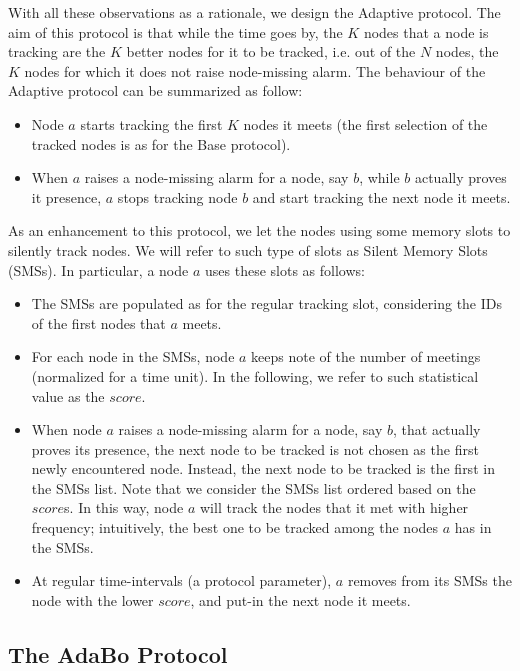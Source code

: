 \documentclass{IEEEconf}
\begin{document}
With all these observations as a rationale, we design the Adaptive protocol. The aim of this protocol is that while the time goes by, the $K$ nodes that a node is tracking are the $K$ better nodes for it to be tracked, i.e. out of the $N$ nodes, the $K$ nodes for which it does not raise node-missing alarm.
The behaviour of the Adaptive protocol can be summarized as follow:
\begin{itemize}
\item Node $a$ starts tracking the first $K$ nodes it meets (the first selection of the tracked nodes is as for the Base protocol).
\item When $a$ raises a node-missing alarm for a node, say $b$, while $b$ actually proves it presence, $a$ stops tracking node $b$ and start tracking the next node it meets.
\end{itemize}
As an enhancement to this protocol, we let the nodes using some memory slots to silently track nodes. We will refer to such type of slots as Silent Memory Slots (SMSs). In particular, a node $a$ uses these slots as follows:
\begin{itemize}
\item The SMSs are populated as for the regular tracking slot, considering the IDs of the first nodes that $a$ meets.
\item For each node in the SMSs, node $a$ keeps note of the number of meetings (normalized for a time unit). In the following, we refer to such statistical value as the $score$.
\item When node $a$ raises a node-missing alarm for a node, say $b$, that actually proves its presence, the next node to be tracked is not chosen as the first newly encountered node. Instead, the next node to be tracked is the first in the SMSs list. Note that we consider the SMSs list ordered based on the $score$s. In this way, node $a$ will track the nodes that it met with higher frequency; intuitively, the best one to be tracked among the nodes  $a$  has in the SMSs.
\item At regular time-intervals (a protocol parameter), $a$ removes from its SMSs the node with the lower $score$, and put-in the next node it meets.
\end{itemize}








\subsection{The AdaBo Protocol}
\label{caching}
\end{document}
